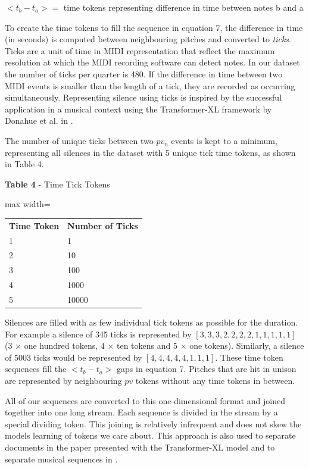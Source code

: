 \documentclass[sigconf]{nimeart}
\begin{document}
$<t_b - t_a> =$ time tokens representing difference in time between notes b and a

To create the time tokens to fill the sequence in equation 7, the difference in time (in seconds) is computed between neighbouring pitches and converted to \emph{ticks}. Ticks are a unit of time in MIDI representation that reflect the maximum resolution at which the MIDI recording software can detect notes. In our dataset the number of ticks per quarter is 480. If the difference in time between two MIDI events is smaller than the length of a tick, they are recorded as occurring simultaneously. Representing silence using ticks is inspired by the successful application in a musical context using the Transformer-XL framework by Donahue et al. in \cite{c8}.

The number of unique ticks between two $pv_n$ events is kept to a minimum, representing all silences in the dataset with 5 unique tick time tokens, as shown in Table 4.

\textbf{Table 4} - Time Tick Tokens

{\def\LTcaptype{none} %
\begin{table}[htbp]\centering\small
\begin{adjustbox}{max width=\columnwidth}\begin{tabular}{ll}
\toprule\noalign{}
\midrule
\textbf{Time Token} & \textbf{Number of Ticks} \\
1 & 1 \\
2 & 10 \\
3 & 100 \\
4 & 1000 \\
5 & 10000 \\
\bottomrule
\end{tabular}\end{adjustbox}\end{table}
}

Silences are filled with as few individual tick tokens as possible for the duration. For example a silence of 345 ticks is represented by $[3,3,3,2,2,2,2,1,1,1,1,1]$ (3 $\times$ one hundred tokens, 4 $\times$ ten tokens and 5 $\times$ one tokens). Similarly, a silence of 5003 ticks would be represented by $[4,4,4,4,4,1,1,1]$. These time token sequences fill the $<t_b - t_a>$ gaps in equation 7. Pitches that are hit in unison are represented by neighbouring $pv$ tokens without any time tokens in between.

All of our sequences are converted to this one-dimensional format and joined together into one long stream. Each sequence is divided in the stream by a special dividing token. This joining is relatively infrequent and does not skew the models learning of tokens we care about. This approach is also used to separate documents in the paper presented with the Transformer-XL model \cite{c29} and to separate musical sequences in \cite{c8}.
\end{document}
